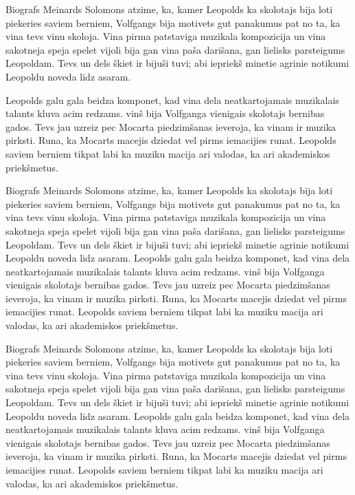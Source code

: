 \documentclass[a4paper]{article}
\begin{document}
Biografs Meinards Solomons atzime, ka, kamer Leopolds ka skolotajs bija loti piekeries saviem berniem, Volfgangs bija motivets gut panakumus pat no ta, ka vina tevs vinu skoloja. Vina pirma patstaviga muzikala kompozicija un vina sakotneja speja spelet vijoli bija gan vina paša darišana, gan lielisks parsteigums Leopoldam. Tevs un dels škiet ir bijuši tuvi; abi iepriekš minetie agrinie notikumi Leopoldu noveda lidz asaram.

Leopolds galu gala beidza komponet, kad vina dela neatkartojamais muzikalais talants kluva acim redzams. vinš bija Volfganga vienigais skolotajs bernibas gados. Tevs jau uzreiz pec Mocarta piedzimšanas ieveroja, ka vinam ir muzika pirksti. Runa, ka Mocarts macejis dziedat vel pirms iemacijies runat. Leopolds saviem berniem tikpat labi ka muziku macija ari valodas, ka ari akademiskos priekšmetus.

Biografs Meinards Solomons atzime, ka, kamer Leopolds ka skolotajs bija loti piekeries saviem berniem, Volfgangs bija motivets gut panakumus pat no ta, ka vina tevs vinu skoloja. Vina pirma patstaviga muzikala kompozicija un vina sakotneja speja spelet vijoli bija gan vina paša darišana, gan lielisks parsteigums Leopoldam. Tevs un dels škiet ir bijuši tuvi; abi iepriekš minetie agrinie notikumi Leopoldu noveda lidz asaram.
Leopolds galu gala beidza komponet, kad vina dela neatkartojamais muzikalais talants kluva acim redzams. vinš bija Volfganga vienigais skolotajs bernibas gados. Tevs jau uzreiz pec Mocarta piedzimšanas ieveroja, ka vinam ir muzika pirksti. Runa, ka Mocarts macejis dziedat vel pirms iemacijies runat. Leopolds saviem berniem tikpat labi ka muziku macija ari valodas, ka ari akademiskos priekšmetus.

Biografs Meinards Solomons atzime, ka, kamer Leopolds ka skolotajs bija loti piekeries saviem berniem, Volfgangs bija motivets gut panakumus pat no ta, ka vina tevs vinu skoloja. Vina pirma patstaviga muzikala kompozicija un vina sakotneja speja spelet vijoli bija gan vina paša darišana, gan lielisks parsteigums Leopoldam. Tevs un dels škiet ir bijuši tuvi; abi iepriekš minetie agrinie notikumi Leopoldu noveda lidz asaram.
Leopolds galu gala beidza komponet, kad vina dela neatkartojamais muzikalais talants kluva acim redzams. vinš bija Volfganga vienigais skolotajs bernibas gados. Tevs jau uzreiz pec Mocarta piedzimšanas ieveroja, ka vinam ir muzika pirksti. Runa, ka Mocarts macejis dziedat vel pirms iemacijies runat. Leopolds saviem berniem tikpat labi ka muziku macija ari valodas, ka ari akademiskos priekšmetus.
\end{document}
